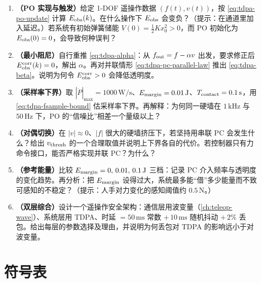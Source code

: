 \begin{practice}[练习]
\begin{enumerate}
  \item \textbf{（PO 实现与触发）}\;给定 1-DOF 遥操作数据 $(f(t),v(t))$，按 \cref{eq:tdpa-po-update} 计算 $E_{\rm obs}(k)$。在什么操作下 $E_{\rm obs}$ 会变负？（提示：在通道里加入延迟。）若系统有初始弹簧储能 $V(0)=\tfrac12Kx_0^2>0$，而 PO 初始化为 $E_{\rm obs}(0)=0$，会导致何种误判？
  \item \textbf{（最小阻尼）}\;自行重推 \cref{eq:tdpa-alpha}：从 $f_{\rm out}=f-\alpha v$ 出发，要求修正后 $E_{\rm obs}^{\rm corr}(k)=0$，解出 $\alpha$。再对并联情形 \cref{eq:tdpa-pc-parallel-law} 推出 \cref{eq:tdpa-beta}。说明为何令 $E_{\rm obs}^{\rm corr}>0$ 会降低透明度。
  \item \textbf{（采样率下界）}\;取 $|\dot P|_{\max}=1000\,\mathrm{W/s}$、$E_{\rm margin}=0.01\,\mathrm J$、$T_{\rm contact}=0.1\,\mathrm s$，用 \cref{eq:tdpa-fsample-bound} 估采样率下界。再解释：为何同一硬墙在 $1\,\mathrm{kHz}$ 与 $50\,\mathrm{Hz}$ 下，PO 的“信噪比”相差一个量级以上？
  \item \textbf{（对偶切换）}\;在 $|v|\approx0$、$|f|$ 很大的硬墙挤压下，若坚持用串联 PC 会发生什么？给出 $v_{\rm thresh}$ 的一个合理取值并说明上下界各自的代价。若控制器只有力命令接口，能否严格实现并联 PC？为什么？
  \item \textbf{（参考能量）}\;比较 $E_{\rm margin}=0,\,0.01,\,0.1\,\mathrm J$ 三档：记录 PC 介入频率与透明度的变化趋势。再分析：把 $E_{\rm margin}$ 设得过大，系统最多能“借”多少能量而不致可感知的不稳定？（提示：人手对力变化的感知阈值约 $0.5\,\mathrm N$。）
  \item \textbf{（双层综合）}\;设计一个遥操作安全架构：通信层用波变量（\cref{ch:teleop-wave}）、系统层用 TDPA、时延 $=50\,\mathrm{ms}$ 常数 $+\,10\,\mathrm{ms}$ 随机抖动 $+\,2\%$ 丢包。给出每层的参数选择及理由，并说明为何丢包对 TDPA 的影响远小于对波变量。
\end{enumerate}
\end{practice}

\section{符号表}
\label{sec:tdpa-symbols}

